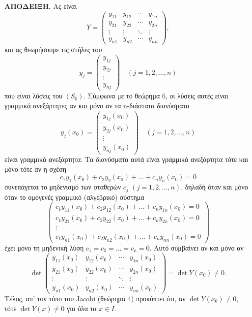 \documentclass[11pt,a4paper,twoside]{book}
\newcommand{\eng}[1]{\selectlanguage{english}#1\selectlanguage{greek}}
\begin{document}
\textbf{ΑΠΟΔΕΙΞΗ.} Ας είναι
\[
Y = 
\begin{pmatrix}
y_{11} & y_{12} & \cdots & y_{1n} \\
y_{21} & y_{22} & \cdots & y_{2n} \\
\vdots & \vdots & \ddots & \vdots \\
y_{n1} & y_{n2} & \cdots & y_{nn}
\end{pmatrix}
,
\]
και ας θεωρήσουμε τις στήλες του
\[
y_j = 
\begin{pmatrix}
y_{1j} \\ y_{2j} \\ \vdots \\ y_{nj}
\end{pmatrix}
\quad (j=1,2,...,n)
\]
που είναι λύσεις του $(S_0)$. Σύμφωνα με το θεώρημα 6, οι λύσεις αυτές είναι γραμμικά ανεξάρτητες αν και μόνο αν τα n-διάστατα διανύσματα
\[
y_j(x_0) = 
\begin{pmatrix}
y_{1j}(x_0) \\
y_{2j}(x_0) \\
\vdots \\
y_{nj}(x_0)
\end{pmatrix}
\quad (j=1,2,...,n)
\]
είναι γραμμικά ανεξάρτητα. Τα διανύσματα αυτά είναι γραμμικά ανεξάρτητα τότε και μόνο τότε αν η σχέση
\[
c_1 y_1(x_0) + c_2 y_2(x_0) + \dots + c_n y_n(x_0) = 0
\]
συνεπάγεται το μηδενισμό των σταθερών $c_j$ $(j=1,2,...,n)$, δηλαδή όταν και μόνο όταν το ομογενές γραμμικό (αλγεβρικό) σύστημα
\[
\begin{pmatrix}
c_1 y_{11}(x_0) + c_2 y_{12}(x_0) + \dots + c_n y_{1n}(x_0) = 0 \\
c_1 y_{21}(x_0) + c_2 y_{22}(x_0) + \dots + c_n y_{2n}(x_0) = 0 \\
\vdots \\
c_1 y_{n1}(x_0) + c_2 y_{n2}(x_0) + \dots + c_n y_{nn}(x_0) = 0
\end{pmatrix}
\]
έχει μόνο τη μηδενική λύση $c_1=c_2=\dots=c_n=0$. Αυτό συμβαίνει αν και μόνο αν
\[
\det
\begin{pmatrix}
y_{11}(x_0) & y_{12}(x_0) & \cdots & y_{1n}(x_0) \\
y_{21}(x_0) & y_{22}(x_0) & \cdots & y_{2n}(x_0) \\
\vdots & \vdots & \ddots & \vdots \\
y_{n1}(x_0) & y_{n2}(x_0) & \cdots & y_{nn}(x_0)
\end{pmatrix}
= \det Y(x_0) \neq 0.
\]
Τέλος, απ' τον τύπο του \eng{Jacobi} (θεώρημα 4) προκύπτει ότι, αν $\det Y(x_0) \neq 0$, τότε $\det Y(x) \neq 0$ για όλα τα $x \in I$.
\end{document}
